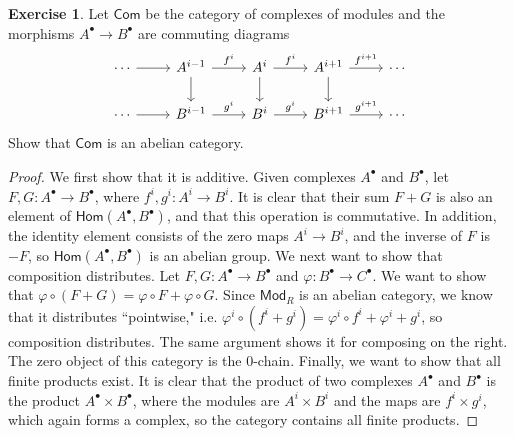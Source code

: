 \documentclass[psamsfonts]{amsart}
\theoremstyle{definition}
\newtheorem{exer}[thm]{Exercise}
\theoremstyle{remark}
\renewcommand{\hom}{\mathsf{Hom}}
\begin{document}
%
\begin{exer}
Let $\mathsf{Com}$ be the category of complexes of modules and the morphisms $A^\bullet \to B^\bullet$ are commuting diagrams
$$\begin{tikzcd}
\cdots \arrow[r] & A^{i-1} \arrow[d] \arrow[r, "f^i"] & A^i \arrow[d] \arrow[r, "f^i"] & A^{i+1} \arrow[d] \arrow[r, "f^{i+1}"] & \cdots \\
\cdots \arrow[r] & B^{i-1} \arrow[r, "g^i"] & B^i \arrow[r, "g^i"] & B^{i+1} \arrow[r, "g^{i+1}"] & \cdots
\end{tikzcd}$$
Show that $\mathsf{Com}$ is an abelian category.
\end{exer}
%
\begin{proof}
We first show that it is additive. Given complexes $A^\bullet$ and $B^\bullet$, let $F,G : A^\bullet \to B^\bullet$, where $f^i,g^i : A^i \to B^i$. It is clear that their sum $F + G$ is also an element of $\hom(A^\bullet, B^\bullet)$, and that this operation is commutative. In addition, the identity element consists of the zero maps $A^i \to B^i$, and the inverse of $F$ is $-F$, so $\hom(A^\bullet, B^\bullet)$ is an abelian group. We next want to show that composition distributes. Let $F,G : A^\bullet \to B^\bullet$ and $\varphi : B^\bullet \to C^\bullet$. We want to show that $\varphi \circ (F + G) = \varphi \circ F + \varphi \circ G$. Since $\mathsf{Mod}_R$ is an abelian category, we know that it distributes ``pointwise," i.e. $\varphi^i \circ (f^i + g^i) = \varphi^i \circ f^i + \varphi^i + g^i$, so composition distributes. The same argument shows it for composing on the right. The zero object of this category is the $0$-chain. Finally, we want to show that all finite products exist. It is clear that the product of two complexes $A^\bullet$ and $B^\bullet$ is the product $A^\bullet \times B^\bullet$, where the modules are $A^i \times B^i$ and the maps are $f^i \times g^i$, which again forms a complex, so the category contains all finite products. 


\end{proof}
\end{document}
